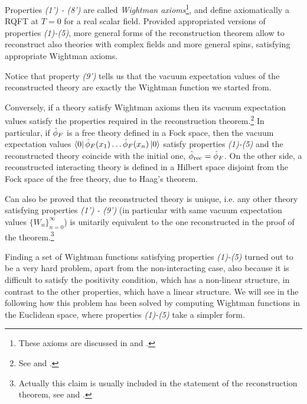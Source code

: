 \documentclass[../main/main.tex]{subfiles}
\begin{document}
Properties \textit{(1') - (8')} are called \emph{Wightman axioms}\footnote{These axioms are discussed in \cite[Section 3.1]{Streater:2000} and \cite[Section 3.2]{Jost.:1965}.}, and define axiomatically a RQFT at $T=0$ for a real scalar field. Provided appropriated versions of properties \textit{(1)-(5)}, more general forms of the reconstruction theorem allow to reconstruct also theories with complex fields and more general spins, satisfying appropriate Wightman axioms. 

Notice that property \textit{(9')} tells us that the vacuum expectation values of the reconstructed theory are exactly the Wightman function we started from. 

Conversely, if a theory satisfy Wightman axioms then its vacuum expectation values satisfy the properties required in the reconstruction theorem.\footnote{See \cite[Theorems 3.1-3.4]{Streater:2000} and \cite[Section 3.3]{Jost.:1965}.}  In particular, if $\hat{\phi}_F$ is a free theory defined in a Fock space, then the vacuum expectation values $\langle0\vert\,\hat{\phi}_F(x_1)\ldots\hat{\phi}_F(x_n)\,\vert0\rangle$ satisfy properties \textit{(1)-(5)} and the reconstructed theory coincide with the initial one, $\hat{\phi}_{\text{rec}}=\hat{\phi}_F$. On the other side, a reconstructed interacting theory is defined in a Hilbert space disjoint from the Fock space of the free theory, due to Haag's theorem. 

Can also be proved that the reconstructed theory is unique, i.e. any other theory satisfying properties \textit{(1') - (9')} (in particular with same vacuum expectation values $\{W_n\}_{n=0}^\infty$) is unitarily equivalent to the one reconstructed in the proof of the theorem.\footnote{Actually this claim is usually included in the statement of the reconstruction theorem, see \cite[Thm. 3.7]{Streater:2000} and \cite[Section 3.4, Thm. 1]{Jost.:1965}.} 

Finding a set of Wightman functions satisfying properties \textit{(1)-(5)} turned out to be a very hard problem, apart from the non-interacting case, also because it is difficult to satisfy the positivity condition, which has a non-linear structure, in contrast to the other properties, which have a linear structure. We will see in the following how this problem has been solved by computing Wightman functions in the Euclidean space, where properties \textit{(1)-(5)} take a simpler form.

\skipline
\end{document}
